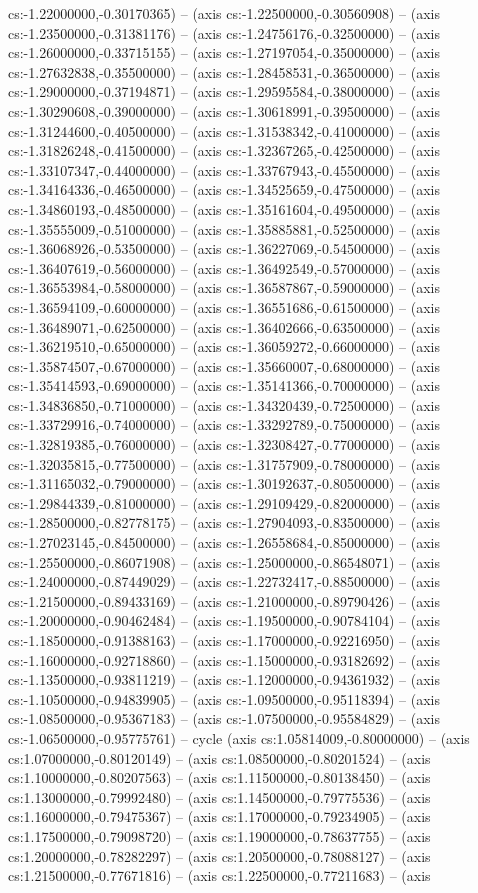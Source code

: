 cs:-1.22000000,-0.30170365) -- (axis cs:-1.22500000,-0.30560908) -- (axis cs:-1.23500000,-0.31381176) -- (axis cs:-1.24756176,-0.32500000) -- (axis cs:-1.26000000,-0.33715155) -- (axis cs:-1.27197054,-0.35000000) -- (axis cs:-1.27632838,-0.35500000) -- (axis cs:-1.28458531,-0.36500000) -- (axis cs:-1.29000000,-0.37194871) -- (axis cs:-1.29595584,-0.38000000) -- (axis cs:-1.30290608,-0.39000000) -- (axis cs:-1.30618991,-0.39500000) -- (axis cs:-1.31244600,-0.40500000) -- (axis cs:-1.31538342,-0.41000000) -- (axis cs:-1.31826248,-0.41500000) -- (axis cs:-1.32367265,-0.42500000) -- (axis cs:-1.33107347,-0.44000000) -- (axis cs:-1.33767943,-0.45500000) -- (axis cs:-1.34164336,-0.46500000) -- (axis cs:-1.34525659,-0.47500000) -- (axis cs:-1.34860193,-0.48500000) -- (axis cs:-1.35161604,-0.49500000) -- (axis cs:-1.35555009,-0.51000000) -- (axis cs:-1.35885881,-0.52500000) -- (axis cs:-1.36068926,-0.53500000) -- (axis cs:-1.36227069,-0.54500000) -- (axis cs:-1.36407619,-0.56000000) -- (axis cs:-1.36492549,-0.57000000) -- (axis cs:-1.36553984,-0.58000000) -- (axis cs:-1.36587867,-0.59000000) -- (axis cs:-1.36594109,-0.60000000) -- (axis cs:-1.36551686,-0.61500000) -- (axis cs:-1.36489071,-0.62500000) -- (axis cs:-1.36402666,-0.63500000) -- (axis cs:-1.36219510,-0.65000000) -- (axis cs:-1.36059272,-0.66000000) -- (axis cs:-1.35874507,-0.67000000) -- (axis cs:-1.35660007,-0.68000000) -- (axis cs:-1.35414593,-0.69000000) -- (axis cs:-1.35141366,-0.70000000) -- (axis cs:-1.34836850,-0.71000000) -- (axis cs:-1.34320439,-0.72500000) -- (axis cs:-1.33729916,-0.74000000) -- (axis cs:-1.33292789,-0.75000000) -- (axis cs:-1.32819385,-0.76000000) -- (axis cs:-1.32308427,-0.77000000) -- (axis cs:-1.32035815,-0.77500000) -- (axis cs:-1.31757909,-0.78000000) -- (axis cs:-1.31165032,-0.79000000) -- (axis cs:-1.30192637,-0.80500000) -- (axis cs:-1.29844339,-0.81000000) -- (axis cs:-1.29109429,-0.82000000) -- (axis cs:-1.28500000,-0.82778175) -- (axis cs:-1.27904093,-0.83500000) -- (axis cs:-1.27023145,-0.84500000) -- (axis cs:-1.26558684,-0.85000000) -- (axis cs:-1.25500000,-0.86071908) -- (axis cs:-1.25000000,-0.86548071) -- (axis cs:-1.24000000,-0.87449029) -- (axis cs:-1.22732417,-0.88500000) -- (axis cs:-1.21500000,-0.89433169) -- (axis cs:-1.21000000,-0.89790426) -- (axis cs:-1.20000000,-0.90462484) -- (axis cs:-1.19500000,-0.90784104) -- (axis cs:-1.18500000,-0.91388163) -- (axis cs:-1.17000000,-0.92216950) -- (axis cs:-1.16000000,-0.92718860) -- (axis cs:-1.15000000,-0.93182692) -- (axis cs:-1.13500000,-0.93811219) -- (axis cs:-1.12000000,-0.94361932) -- (axis cs:-1.10500000,-0.94839905) -- (axis cs:-1.09500000,-0.95118394) -- (axis cs:-1.08500000,-0.95367183) -- (axis cs:-1.07500000,-0.95584829) -- (axis cs:-1.06500000,-0.95775761) -- cycle (axis cs:1.05814009,-0.80000000) -- (axis cs:1.07000000,-0.80120149) -- (axis cs:1.08500000,-0.80201524) -- (axis cs:1.10000000,-0.80207563) -- (axis cs:1.11500000,-0.80138450) -- (axis cs:1.13000000,-0.79992480) -- (axis cs:1.14500000,-0.79775536) -- (axis cs:1.16000000,-0.79475367) -- (axis cs:1.17000000,-0.79234905) -- (axis cs:1.17500000,-0.79098720) -- (axis cs:1.19000000,-0.78637755) -- (axis cs:1.20000000,-0.78282297) -- (axis cs:1.20500000,-0.78088127) -- (axis cs:1.21500000,-0.77671816) -- (axis cs:1.22500000,-0.77211683) -- (axis 